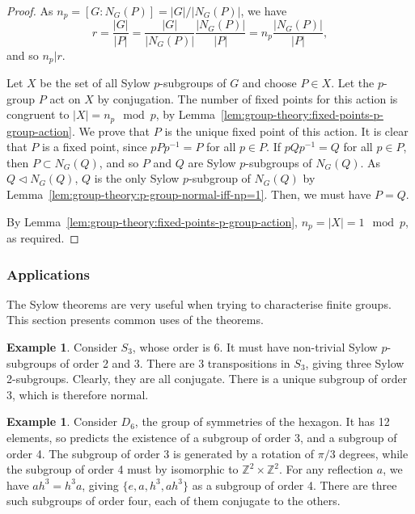 \documentclass[12pt]{report}
\theoremstyle{definition}
\newtheorem{example}[theorem]{Example}
\begin{document}
\begin{proof}
  As \(n_{p} = [G : N_{G}(P)] = |G|/|N_{G}(P)|\), we have
  \[r = \frac{|G|}{|P|} = \frac{|G|}{|N_{G}(P)|} \frac{|N_{G}(P)|}{|P|} = n_{p}\frac{|N_{G}(P)|}{|P|},\]
  and so \(n_{p} | r\).

  Let \(X\) be the set of all Sylow \(p\)-subgroups of \(G\) and choose \(P \in X\). Let the \(p\)-group \(P\) act on \(X\) by conjugation. The number of fixed points for this action is congruent to \(|X| = n_{p} \mod p\), by Lemma~\ref{lem:group-theory:fixed-points-p-group-action}. We prove that \(P\) is the unique fixed point of this action.
  It is clear that \(P\) is a fixed point, since \(pPp^{-1} = P\) for all \(p \in P\). If \(pQp^{-1} = Q\) for all \(p \in P\), then \(P \subset N_{G}(Q)\), and so \(P\) and \(Q\) are Sylow \(p\)-subgroups of \(N_{G}(Q)\). As \(Q \triangleleft N_{G}(Q)\), \(Q\) is the only Sylow \(p\)-subgroup of \(N_{G}(Q)\) by Lemma~\ref{lem:group-theory:p-group-normal-iff-np=1}. Then, we must have \(P = Q\).

  By Lemma~\ref{lem:group-theory:fixed-points-p-group-action}, \(n_{p} = |X| = 1 \mod p\), as required.
\end{proof}


\subsubsection{Applications}
The Sylow theorems are very useful when trying to characterise finite groups. This section presents common uses of the theorems.

\begin{example}
  Consider \(S_{3}\), whose order is 6. It must have non-trivial Sylow \(p\)-subgroups of order 2 and 3. There are 3 transpositions in \(S_{3}\), giving three Sylow 2-subgroups. Clearly, they are all conjugate.
  There is a unique subgroup of order 3, which is therefore normal.
\end{example}

\begin{example}
  Consider \(D_{6}\), the group of symmetries of the hexagon. It has 12 elements, so  predicts the existence of a subgroup of order 3, and a subgroup of order 4. The subgroup of order 3 is generated by a rotation of \(\pi / 3\) degrees, while the subgroup of order 4 must by isomorphic to \(\mathbb Z^{2} \times \mathbb Z^{2}\). For any reflection \(a\), we have \(ah^{3} = h^{3} a\), giving \(\{e, a, h^{3}, ah^{3}\}\) as a subgroup of order 4. There are three such subgroups of order four, each of them conjugate to the others.
\end{example}
\end{document}
